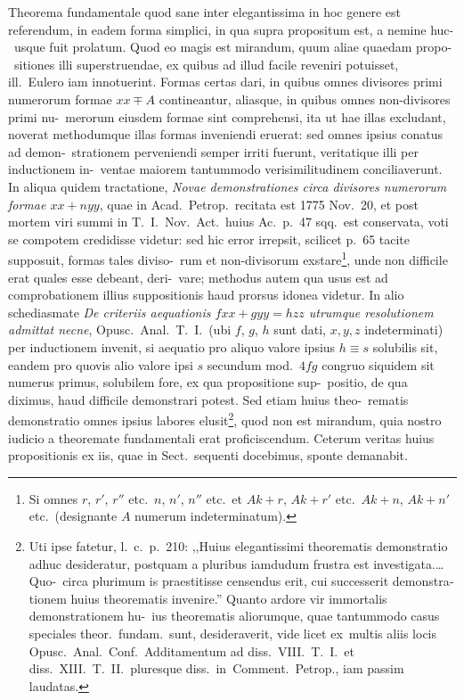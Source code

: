 \documentclass[12pt,a4paper]{article}
\theoremstyle{plain}
\theoremstyle{definition}
\theoremstyle{remark}
\begin{document}
Theorema fundamentale quod sane inter elegantissima in hoc genere est
referendum, in eadem forma simplici, in qua supra propositum est, a nemine huc-\ usque fuit prolatum. Quod eo magis est mirandum, quum aliae quaedam propo-\ sitiones illi superstruendae, ex quibus ad illud facile reveniri potuisset, ill.\ Eulero
iam innotuerint. Formas certas dari, in quibus omnes divisores primi numerorum
formae $xx \mp A$ contineantur, aliasque, in quibus omnes non-divisores primi nu-\ merorum eiusdem formae sint comprehensi, ita ut hae illas excludant, noverat
methodumque illas formas inveniendi eruerat: sed omnes ipsius conatus ad demon-\ strationem perveniendi semper irriti fuerunt, veritatique illi per inductionem in-\ ventae maiorem tantummodo verisimilitudinem conciliaverunt. In aliqua quidem
tractatione, \emph{Novae demonstrationes circa divisores numerorum formae $xx+nyy$},
quae in Acad.\ Petrop.\ recitata est 1775 Nov.\ 20, et post mortem viri summi in
T.~I.\ Nov.\ Act.\ huius Ac.\ p.~47 sqq.\ est conservata, voti se compotem credidisse
videtur: sed hic error irrepsit, scilicet p.~65 tacite supposuit, formas tales diviso-\ rum et non-divisorum exstare\footnote{Si omnes $r$, $r'$, $r''$ etc.\ $n$, $n'$, $n''$ etc.\ et $Ak+r$, $Ak+r'$ etc.\ $Ak+n$, $Ak+n'$ etc.\ (designante $A$ numerum indeterminatum).}, unde non difficile erat quales esse debeant, deri-\ vare; methodus autem qua usus est ad comprobationem illius suppositionis haud
prorsus idonea videtur. In alio schediasmate \emph{De criteriis aequationis $fxx+gyy=hzz$
utrumque resolutionem admittat necne}, Opusc.\ Anal.\ T.~I.\ (ubi $f$, $g$, $h$ sunt dati,
$x,y,z$ indeterminati) per inductionem invenit, si aequatio pro aliquo valore ipsius
$h \equiv s$ solubilis sit, eandem pro quovis alio valore ipsi $s$ secundum mod.\ $4fg$
congruo siquidem sit numerus primus, solubilem fore, ex qua propositione sup-\ positio, de qua diximus, haud difficile demonstrari potest. Sed etiam huius theo-\ rematis demonstratio omnes ipsius labores elusit\footnote{Uti ipse fatetur, l.~c.\ p.~210: \foreignlanguage{latin}{,,Huius elegantissimi theorematis demonstratio adhuc desideratur, postquam a pluribus iamdudum frustra est investigata.\ldots Quo-\ circa plurimum is praestitisse censendus erit, cui successerit demonstrationem huius theorematis invenire.''} Quanto ardore vir immortalis demonstrationem hu-\ ius theorematis aliorumque, quae tantummodo casus speciales theor.\ fundam.\ sunt, desideraverit, vide licet ex\ multis aliis locis Opusc.\ Anal.\ Conf.\ Additamentum ad diss.~VIII.\ T.~I.\ et diss.~XIII.\ T.~II.\ pluresque diss.\ in\ Comment.\ Petrop., iam passim laudatas.}, quod non est mirandum, quia
nostro iudicio a theoremate fundamentali erat proficiscendum. Ceterum veritas
huius propositionis ex iis, quae in Sect.\ sequenti docebimus, sponte demanabit.
\end{document}
